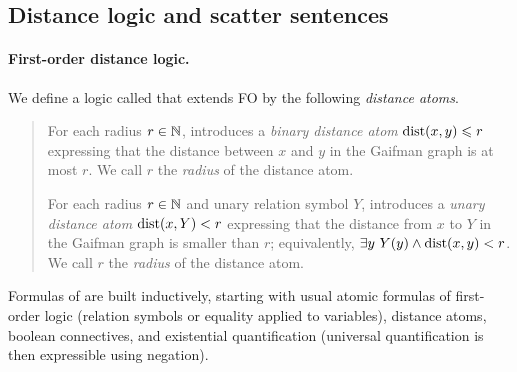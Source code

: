 



\subsection{Distance logic and scatter sentences}\label{sec:typedefs}


\paragraph{First-order distance logic.}
We define a logic called \distFO that extends FO by the following \emph{distance atoms}.
\begin{quote}
     For each radius \(r \in \mathbb N\), \distFO introduces
        a \emph{binary distance atom} \(\mathrm{dist}(x,y) \leqslant r\) expressing that the distance between \(x\) and \(y\) in the Gaifman graph is at most \(r\).
        We call \(r\) the \emph{radius} of the distance atom.

     For each radius \(r \in \mathbb N\) and unary relation symbol \(Y\), \distFO introduces
        a \emph{unary distance atom} \(\mathrm{dist}(x,Y) < r\) expressing that the distance from \(x\) to \(Y\) in the Gaifman graph is smaller than \(r\);
        equivalently, \(\exists y~Y(y) \land \mathrm{dist}(x,y) < r\).
        We call \(r\) the \emph{radius} of the distance atom.
\end{quote}
Formulas of \distFO are built inductively,
starting with usual atomic formulas of first-order logic (relation symbols or equality applied to variables), distance atoms, boolean connectives, and existential quantification (universal quantification is then expressible using negation).


